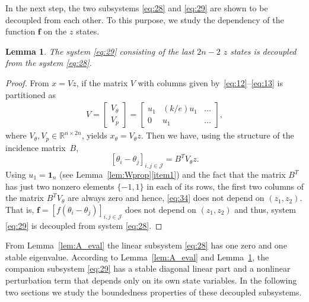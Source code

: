 \documentclass[letter, 10pt, conference]{ieeeconf}
\newtheorem{lemma}[theorem]{Lemma}
\newcommand{\R}{\mathbb{R}}
\newcommand{\J}{\mathcal{J}}
\newcommand{\1}{\mathbf{1}}
\newcommand{\0}{\mathbf{0}}
\begin{document}
{In the next step, the two subsystems \eqref{eq:28} and \eqref{eq:29}
are shown to be decoupled from each other. To this purpose, we study
the dependency of the function $\mathbf{f}$ on the $z$ states.

\begin{lemma}
  \label{lem:decoup_sys}
  The system \eqref{eq:29} consisting of the last $2n-2$ $z$ states is
  decoupled from the system \eqref{eq:28}.
\end{lemma}
\begin{proof}
  From $x=Vz$, if the matrix $V$ with columns given
  by~\eqref{eq:12}--\eqref{eq:13} is partitioned as
  \begin{align}
  	\label{eq:33}
	V=\left[\begin{smallmatrix} V_\theta \\ V_p \end{smallmatrix}\right]
	=\left[\begin{smallmatrix}
		u_1 & (k/e) u_1 & \dots \\
		0   & u_1 & \dots
	\end{smallmatrix}\right],
  \end{align}
  where $V_\theta,V_p \in \R^{n \times 2n}$, yields $x_\theta=V_\theta
  z$. Then we have, using the structure of the incidence matrix~$B$,
  \begin{equation}
	\label{eq:34}
	[\theta_i-\theta_j]_{i,j\in\J} = B^T V_\theta z.
  \end{equation}
  Using $u_1=\1_n$ (see Lemma~\ref{lem:Wprop}\eqref{item1}) and the
  fact that the matrix $B^T$ has just two nonzero elements $\{-1,1\}$
  in each of its rows, the first two columns of the matrix $B^T
  V_\theta$ are always zero and hence, \eqref{eq:34} does not depend
  on $(z_1,z_2)$.  That is,
  $\mathbf{f}=[f(\theta_i-\theta_j)]_{i,j\in\J}$ does not depend on
  $(z_1,z_2)$ and thus, system \eqref{eq:29} is decoupled from system
  \eqref{eq:28}.
\end{proof}

From Lemma~\ref{lem:A_eval} the linear subsystem \eqref{eq:28} has one
zero and one stable eigenvalue.  According to Lemma~\ref{lem:A_eval}
and Lemma~\ref{lem:decoup_sys}, the companion subsystem \eqref{eq:29}
has a stable diagonal linear part and a nonlinear perturbation term
that depends only on its own state variables. In the following two
sections we study the boundedness properties of these decoupled
subsystems.

}
\end{document}
